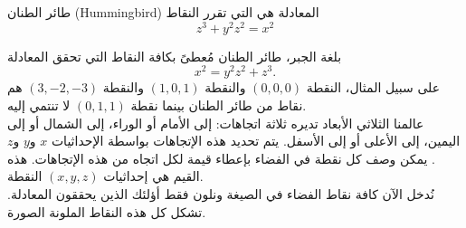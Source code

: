 \begin{surferPage}{طائر الطنان (Hummingbird)}
المعادلة هي التي تقرر النقاط\\
  
  \smallskip
\[z^3+ y^2	z^2	= x^2\]

\singlespacing
بلغة الجبر، طائر الطنان مُعطىً بكافة النقاط التي تحقق المعادلة
\smallskip
\[ x^2= y^2z^2+z^3.\]
\smallskip
على سبيل المثال، النقطة
 $(0,0,0)$
  والنقطة  
  $(1,0,1)$
   والنقطة
 $(3,-2,-3)$ 
    هم نقاط من طائر الطنان بينما نقطة
     $(0,1,1)$
      لا تنتمي إليه.\\
 \singlespacing
عالمنا الثلاثي الأبعاد تديره ثلاثة اتجاهات: إلى الأمام أو الوراء، إلى الشمال أو إلى اليمين، إلى الأعلى أو إلى الأسفل. يتم تحديد هذه الإتجاهات بواسطة الإحداثيات $x$ و$y$ و$z$. يمكن وصف كل نقطة في الفضاء بإعطاء قيمة لكل اتجاه من هذه الإتجاهات. هذه القيم هي إحداثيات
 $(x,y,z)$
  النقطة.\\
\singlespacing
نُدخل الآن كافة نقاط الفضاء في الصيغة ونلون فقط أؤلئك الذين يحققون المعادلة. تشكل كل هذه النقاط الملونة الصورة.
\end{surferPage}